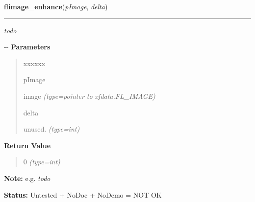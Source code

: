     \label{xformslib:flflimage:flimage_enhance}

    \vspace{0.5ex}

\hspace{.8\funcindent}\begin{boxedminipage}{\funcwidth}

    \raggedright \textbf{flimage\_enhance}(\textit{pImage}, \textit{delta})

    \vspace{-1.5ex}

    \rule{\textwidth}{0.5\fboxrule}
\setlength{\parskip}{2ex}

\emph{todo}

-{}-
\setlength{\parskip}{1ex}
      \textbf{Parameters}
      \vspace{-1ex}

      \begin{quote}
        \begin{Ventry}{xxxxxx}

          \item[pImage]


image
            {\it (type=pointer to xfdata.FL\_IMAGE)}

          \item[delta]


unused.
            {\it (type=int)}

        \end{Ventry}

      \end{quote}

      \textbf{Return Value}
    \vspace{-1ex}

      \begin{quote}

0
      {\it (type=int)}

      \end{quote}

\textbf{Note:} 
e.g. \emph{todo}


\textbf{Status:} 
Untested + NoDoc + NoDemo = NOT OK


    \end{boxedminipage}

    \label{xformslib:flflimage:flimage_from_pixmap}

